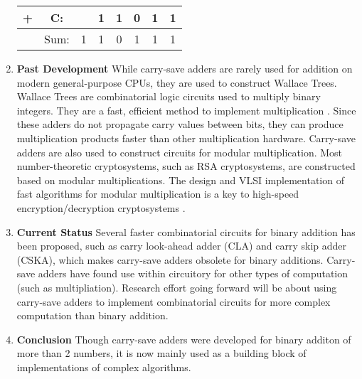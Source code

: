 \documentclass[11pt,oneside,a4paper]{article}
\begin{document}
\begin{enumerate}[wide, labelwidth=!, labelindent=0pt]
{\begin{tabular}{cccccccc}
+ &C: & &1 &1 &0 &1 &1 \\
\hline
&Sum: &1 &1 &0 &1 &1 &1
\end{tabular}}
		\item \textbf{Past Development} \newline
		While carry-save adders are rarely used for addition on modern general-purpose CPUs, they are used to construct Wallace Trees. Wallace Trees are combinatorial logic circuits used to multiply binary integers. They are a fast, efficient method to implement multiplication . Since
these adders do not propagate carry values between bits, they can produce multiplication products faster than other multiplication hardware\cite{dokachev_carpinelli_2015}.
		\newline \newline
		Carry-save adders are also used to construct circuits for modular multiplication. Most number-theoretic cryptosystems, such as RSA cryptosystems, are constructed based on modular multiplications. The design and VLSI implementation of fast algorithms for modular multiplication is a key to high-speed encryption/decryption cryptosystems \cite{introduction_to_biometric}.
		
		\item \textbf{Current Status} \newline
		Several faster combinatorial circuits for binary addition has been proposed, such as carry look-ahead adder (CLA) and carry skip adder (CSKA), which makes carry-save adders obsolete for binary additions. Carry-save adders have found use within circuitory for other types of computation (such as multipliation). Research effort going forward will be about using carry-save adders to implement combinatorial circuits for more complex computation than binary addition.
		 
		\item \textbf{Conclusion} \newline
		Though carry-save adders were developed for binary additon of more than 2 numbers, it is now mainly used as a building block of implementations of complex algorithms.
	\end{enumerate}		
	
 

\end{document}
